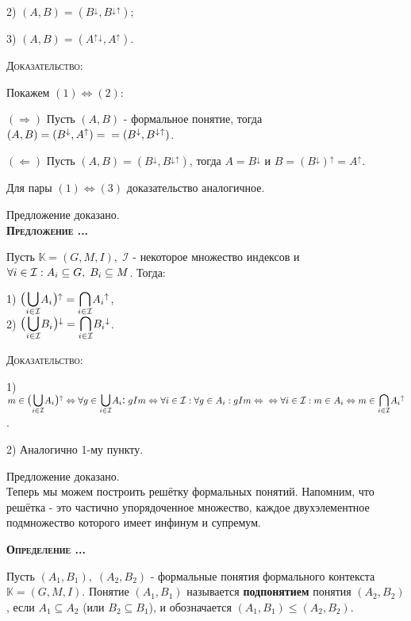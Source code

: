 \documentclass[18pt, a4paper]{extarticle}
\newcounter{par}
\newcounter{spar}
\newcounter{zap}
\newcommand{\opr}{\textbf{\textsc{Определение \thepar.\if\thespar1\thespar.\fi\thezap.\;}}\stepcounter{zap}}
\newcommand{\predl}{\textbf{\textsc{Предложение \thepar.\if\thespar1\thespar.\fi\thezap.\;}}\stepcounter{zap}}
\newcommand{\dok}{\textsc{Доказательство:}}
\newcommand{\rightdok}{\boxed{(\Rightarrow)}}
\newcommand{\leftdok}{\boxed{(\Leftarrow)}}
\newcommand{\galoisup}{{^\uparrow}}
\newcommand{\galoisdown}{{^\downarrow}}
\newcommand{\ki}{\mathcal{I}}
\newcommand{\bigs}[1]{\scalebox{1.3}{$#1$}}
\begin{document}
2) $(A,B)=(B\galoisdown,B\galoisdown\galoisup)$;

3) $(A,B)=(A\galoisup\galoisdown,A\galoisup)$.\newpage

\dok

Покажем $(1)\Leftrightarrow (2)$:

$\rightdok$ Пусть $(A,B)$ - формальное понятие, тогда $(A,B)=(B\galoisdown,A\galoisup)=\newline=(B\galoisdown,B\galoisdown\galoisup)$.

$\leftdok$ Пусть $(A,B)=(B\galoisdown,B\galoisdown\galoisup)$, тогда $A=B\galoisdown$ и $B=(B\galoisdown)\galoisup=A\galoisup$.

Для пары $(1)\Leftrightarrow (3)$ доказательство аналогичное.

Предложение доказано.\\

\predl

Пусть $\mathbb{K}=(G,M,I),\;\ki$ - некоторое множество индексов и $\forall i\in\ki:\newline A_i\subseteq G,\;B_i\subseteq M$. Тогда:

1) $\bigs(\underset{i\in\ki}{\bigs\bigcup}A_i\bigs)\galoisup=\underset{i\in\ki}{\bigs\bigcap}A_i\galoisup$,\\

2) $\bigs(\underset{i\in\ki}{\bigs\bigcup}B_i\bigs)\galoisdown=\underset{i\in\ki}{\bigs\bigcap}B_i\galoisdown$.

\dok

1) $m\in\bigs(\underset{i\in\ki}{\bigs\bigcup}A_i\bigs)\galoisup\Leftrightarrow\forall g\in\underset{i\in\ki}{\bigs\bigcup}A_i\bigs:\;gIm\Leftrightarrow\forall i\in\ki:\forall g\in A_i:gIm\Leftrightarrow\newline\newline
\Leftrightarrow\forall i\in\ki:m\in A_i\Leftrightarrow m\in\underset{i\in\ki}{\bigs\bigcap}A_i\galoisup$.

2) Аналогично 1-му пункту.

Предложение доказано.\\

Теперь мы можем построить решётку формальных понятий. Напомним, что решётка - это частично упорядоченное множество, каждое двухэлементное подмножество которого имеет инфинум и супремум.\newpage

\opr

Пусть $(A_1,B_1),\;(A_2,B_2)$ - формальные понятия формального контекста $\mathbb{K}=(G,M,I)$. Понятие $(A_1,B_1)$ называется \textbf{подпонятием} понятия $(A_2,B_2)$, если $A_1\subseteq A_2$ (или $B_2\subseteq B_1$), и
обозначается $(A_1,B_1)\le(A_2,B_2)$.
\end{document}

